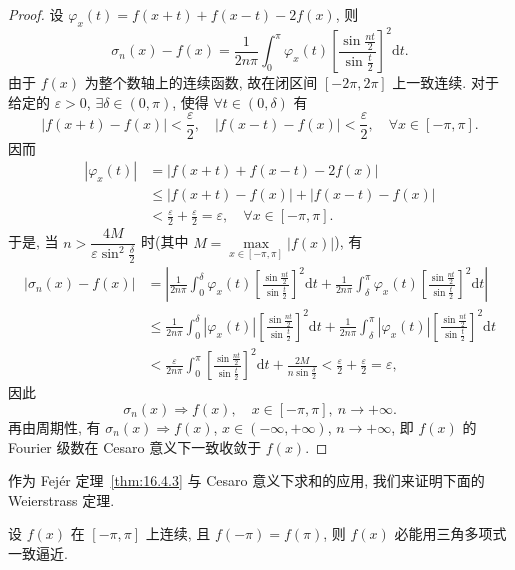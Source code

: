 \begin{proof}
设 $\varphi_{x}(t)=f(x+t)+f(x-t)-2f(x)$, 则
\[
  \sigma_{n}(x)-f(x)=\frac{1}{2n\pi}\int_{0}^{\pi}\varphi_{x}(t)\left[\frac{\sin\frac{nt}{2}}{\sin\frac{t}{2}}\right]^{2}\mathrm{d}t.
\]
由于 $f(x)$ 为整个数轴上的连续函数, 故在闭区间 $[-2\pi,2\pi]$ 上一致连续. 对于给定的 $\varepsilon>0$, $\exists\delta\in(0,\pi)$, 使得 $\forall t\in(0,\delta)$ 有
\[
  |f(x+t)-f(x)|<\frac{\varepsilon}{2},\quad|f(x-t)-f(x)|<\frac{\varepsilon}{2},\quad\forall x\in[-\pi,\pi].
\]
因而
\begin{align*}
  |\varphi_{x}(t)|&=|f(x+t)+f(x-t)-2f(x)|\\
  &\leqslant|f(x+t)-f(x)|+|f(x-t)-f(x)|\\
  &<\frac{\varepsilon}{2}+\frac{\varepsilon}{2}=\varepsilon,\quad\forall x\in[-\pi,\pi].
\end{align*}
于是, 当 $n>\dfrac{4M}{\varepsilon\sin^{2}\frac{\delta}{2}}$ 时(其中 $M=\max\limits_{x\in[-\pi,\pi]}|f(x)|$), 有
\begin{align*}
  |\sigma_{n}(x)-f(x)|
  &=\left|\frac{1}{2n\pi}\int_{0}^{\delta}\varphi_{x}(t)\left[\frac{\sin\frac{nt}{2}}{\sin\frac{t}{2}}\right]^{2}\mathrm{d}t+\frac{1}{2n\pi}\int_{\delta}^{\pi}\varphi_{x}(t)\left[\frac{\sin\frac{nt}{2}}{\sin\frac{t}{2}}\right]^{2}\mathrm{d}t\right|\\
  &\leqslant\frac{1}{2n\pi}\int_{0}^{\delta}|\varphi_{x}(t)|\left[\frac{\sin\frac{nt}{2}}{\sin\frac{t}{2}}\right]^{2}\mathrm{d}t+\frac{1}{2n\pi}\int_{\delta}^{\pi}|\varphi_{x}(t)|\left[\frac{\sin\frac{nt}{2}}{\sin\frac{t}{2}}\right]^{2}\mathrm{d}t\\
  &<\frac{\varepsilon}{2n\pi}\int_{0}^{\pi}\left[\frac{\sin\frac{nt}{2}}{\sin\frac{t}{2}}\right]^{2}\mathrm{d}t+\frac{2M}{n\sin\frac{\delta}{2}}<\frac{\varepsilon}{2}+\frac{\varepsilon}{2}=\varepsilon,
\end{align*}
因此
\[
  \sigma_{n}(x)\Rightarrow f(x),\quad x\in[-\pi,\pi],\ n\to+\infty.
\]
再由周期性, 有 $\sigma_{n}(x)\Rightarrow f(x)$, $x\in(-\infty,+\infty)$, $n\to+\infty$, 即 $f(x)$ 的 Fourier 级数在 Cesaro 意义下一致收敛于 $f(x)$.
\end{proof}

作为 Fej\'er 定理~\ref{thm:16.4.3} 与 Cesaro 意义下求和的应用, 我们来证明下面的 Weierstrass 定理.

\begin{theorem}[Weierstrass]\label{thm:16.4.4}
设 $f(x)$ 在 $[-\pi,\pi]$ 上连续, 且 $f(-\pi)=f(\pi)$, 则 $f(x)$ 必能用三角多项式一致逼近.
\end{theorem}

